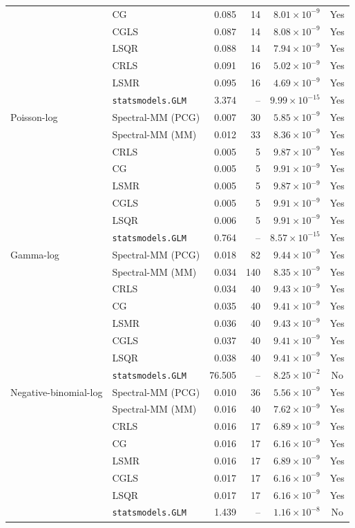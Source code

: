 \documentclass[10pt,a4paper]{article}
\begin{document}
\begin{longtable}{llrrrc}
 & CG & 0.085 & 14 & $8.01\times10^{-9}$ & Yes \\
 & CGLS & 0.087 & 14 & $8.08\times10^{-9}$ & Yes \\
 & LSQR & 0.088 & 14 & $7.94\times10^{-9}$ & Yes \\
 & CRLS & 0.091 & 16 & $5.02\times10^{-9}$ & Yes \\
 & LSMR & 0.095 & 16 & $4.69\times10^{-9}$ & Yes \\
 & \texttt{statsmodels.GLM} & 3.374 & -- & $9.99\times10^{-15}$ & Yes \\
\midrule
Poisson-log & Spectral-MM (PCG) & 0.007 & 30 & $5.85\times10^{-9}$ & Yes \\
 & Spectral-MM (MM) & 0.012 & 33 & $8.36\times10^{-9}$ & Yes \\
 & CRLS & 0.005 & 5 & $9.87\times10^{-9}$ & Yes \\
 & CG & 0.005 & 5 & $9.91\times10^{-9}$ & Yes \\
 & LSMR & 0.005 & 5 & $9.87\times10^{-9}$ & Yes \\
 & CGLS & 0.005 & 5 & $9.91\times10^{-9}$ & Yes \\
 & LSQR & 0.006 & 5 & $9.91\times10^{-9}$ & Yes \\
 & \texttt{statsmodels.GLM} & 0.764 & -- & $8.57\times10^{-15}$ & Yes \\
\midrule
Gamma-log & Spectral-MM (PCG) & 0.018 & 82 & $9.44\times10^{-9}$ & Yes \\
 & Spectral-MM (MM) & 0.034 & 140 & $8.35\times10^{-9}$ & Yes \\
 & CRLS & 0.034 & 40 & $9.43\times10^{-9}$ & Yes \\
 & CG & 0.035 & 40 & $9.41\times10^{-9}$ & Yes \\
 & LSMR & 0.036 & 40 & $9.43\times10^{-9}$ & Yes \\
 & CGLS & 0.037 & 40 & $9.41\times10^{-9}$ & Yes \\
 & LSQR & 0.038 & 40 & $9.41\times10^{-9}$ & Yes \\
 & \texttt{statsmodels.GLM} & 76.505 & -- & $8.25\times10^{-2}$ & No \\
\midrule
Negative-binomial-log & Spectral-MM (PCG) & 0.010 & 36 & $5.56\times10^{-9}$ & Yes \\
 & Spectral-MM (MM) & 0.016 & 40 & $7.62\times10^{-9}$ & Yes \\
 & CRLS & 0.016 & 17 & $6.89\times10^{-9}$ & Yes \\
 & CG & 0.016 & 17 & $6.16\times10^{-9}$ & Yes \\
 & LSMR & 0.016 & 17 & $6.89\times10^{-9}$ & Yes \\
 & CGLS & 0.017 & 17 & $6.16\times10^{-9}$ & Yes \\
 & LSQR & 0.017 & 17 & $6.16\times10^{-9}$ & Yes \\
 & \texttt{statsmodels.GLM} & 1.439 & -- & $1.16\times10^{-8}$ & No \\
\end{longtable}
\end{document}
